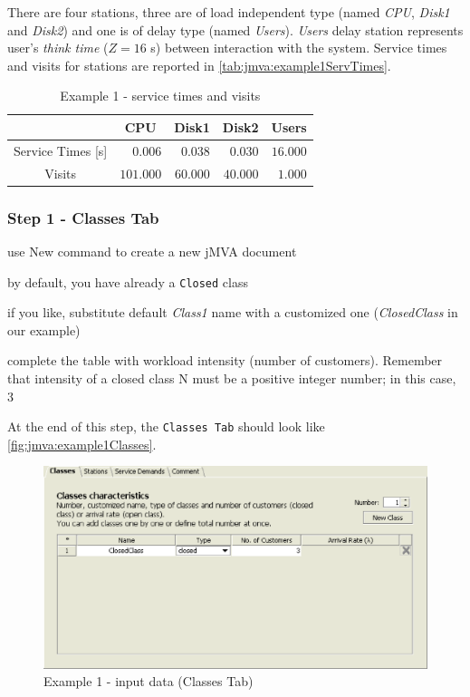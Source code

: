 There are four stations, three are of load independent type (named
\emph{CPU}, \emph{Disk1} and \emph{Disk2}) and one is of delay type
(named \emph{Users}). \emph{Users} delay station represents user's
\emph{think time} ($Z = 16$ s) between interaction with the system.
Service times and visits for stations are reported in
\autoref{tab:jmva:example1ServTimes}.

\begin{table}[htbp]
\begin{center}
\begin{tabular}{c|r|r|r|r|}
& \multicolumn{1}{c|}{CPU} & \multicolumn{1}{c|}{Disk1} & \multicolumn{1}{c|}{Disk2} & \multicolumn{1}{c|}{Users}\\
\hline
Service Times [s] & $0.006$ & $0.038$ & $0.030$ & $16.000$\\
Visits & $101.000$ & $60.000$ & $40.000$ & $1.000$\\
\hline
\end{tabular}
\end{center}
\caption{Example 1 - service times and visits}
\label{tab:jmva:example1ServTimes}
\end{table}

\subsubsection{Step 1 - Classes Tab}
\begin{itemize*}
\item use New command to create a new jMVA document
\item by default, you have already a \texttt{Closed} class
\item if you like, substitute default \emph{Class1} name with a customized
one (\emph{ClosedClass} in our example)
\item complete the table with workload intensity (number of customers). Remember that
intensity of a closed class N must be a positive integer number; in
this case, 3
\end{itemize*}

At the end of this step, the \texttt{Classes Tab} should look like
\autoref{fig:jmva:example1Classes}.

\begin{figure}[htbp]
    \begin{center}
        \includegraphics[scale=.5]{img/jmva/example1Class}
    \end{center}
    \caption{Example 1 - input data (Classes Tab)}
    \label{fig:jmva:example1Classes}
\end{figure}

